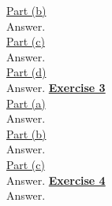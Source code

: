 \documentclass[a4paper, 11pt]{article}
\begin{document}
\newline \underline{Part (b)}\\
\newline Answer.\\
\newline \underline{Part (c)}\\
\newline Answer.\\
\newline \underline{Part (d)}\\
\newline Answer.
\newpage
\textbf{\underline{Exercise 3}}\\
\newline \underline{Part (a)}\\
\newline Answer.\\
\newline \underline{Part (b)}\\
\newline Answer.\\
\newline \underline{Part (c)}\\
\newline Answer.
\newpage
\textbf{\underline{Exercise 4}}\\
\newline Answer.
\end{document}
